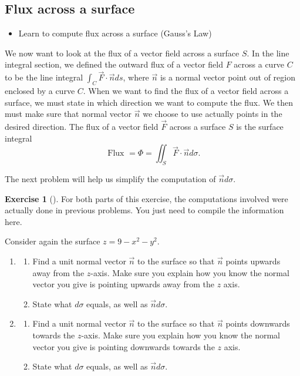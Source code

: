 \documentclass[10pt,]{book}
\theoremstyle{plain}
\theoremstyle{definition}
\theoremstyle{definition}
\theoremstyle{definition}
\theoremstyle{definition}
\newtheorem{exploration}[project]{Exercise}
\theoremstyle{definition}
\numberwithin{equation}{section}
\newcommand{\ds}{\displaystyle}
\begin{document}
\subsection[{Flux across a surface}]{Flux across a surface}\label{subsection-63}
\leavevmode%
\begin{itemize}[label=\textbullet]
\item{}Learn to compute flux across a surface (Gauss's Law)%
\end{itemize}
We now want to look at the flux of a vector field across a surface \(S\). In the line integral section, we defined the outward flux of a vector field \(F\) across a curve \(C\) to be the line integral \(\ds \int_C \vec F\cdot \vec n ds\), where \(\vec n\) is a normal vector point out of region enclosed by a curve \(C\). When we want to find the flux of a vector field across a surface, we must state in which direction we want to compute the flux. We then must make sure that normal vector \(\vec n\) we choose to use actually points in the desired direction. The flux of a vector field \(\vec F\) across a surface \(S\) is the surface integral%
\begin{equation*}
\text{ Flux } =\Phi 
= \iint_S \vec F\cdot \vec n d\sigma 
.
\end{equation*}
%
\par
The next problem will help us simplify the computation of \(\vec nd\sigma\).%
\begin{exploration}[]\label{exploration-281}
For both parts of this exercise, the computations involved were actually done in previous problems. You just need to compile the information here.%
\par
Consider again the surface \(z=9-x^2-y^2\).%
\begin{enumerate}[font=\bfseries,label=(\alph*),ref=\alph*]
\item\label{task-774} \begin{enumerate}[font=\bfseries,label=(\roman*),ref=\theenumi.\roman*]
\item\label{task-775} Find a unit normal vector \(\vec n\) to the surface so that \(\vec n\) points upwards away from the \(z\)-axis. Make sure you explain how you know the normal vector you give is pointing upwards away from the \(z\) axis.%
\item\label{task-776} State what \(d\sigma\) equals, as well as \(\vec n d\sigma\).%
\end{enumerate}
\item\label{task-777} \begin{enumerate}[font=\bfseries,label=(\roman*),ref=\theenumi.\roman*]
\item\label{task-778} Find a unit normal vector \(\vec n\) to the surface so that \(\vec n\) points downwards towards the \(z\)-axis. Make sure you explain how you know the normal vector you give is pointing downwards towards the \(z\) axis.%
\item\label{task-779} State what \(d\sigma\) equals, as well as \(\vec n d\sigma\).%
\end{enumerate}
\end{enumerate}
\end{exploration}
\end{document}
